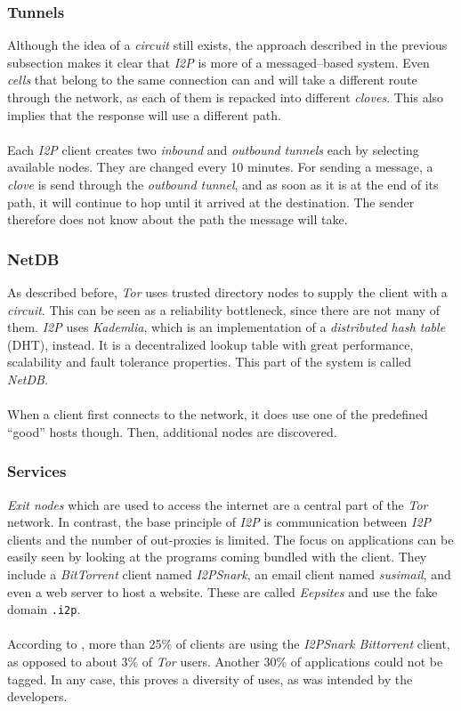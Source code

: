 \documentclass{sig-alternate}
\begin{document}
\subsubsection{Tunnels}
Although the idea of a \emph{circuit} still exists, the approach described in the previous subsection makes it clear that \emph{I2P} is more of a messaged--based system.
Even \emph{cells} that belong to the same connection can and will take a different route through the network, as each of them is repacked into different \emph{cloves}.
This also implies that the response will use a different path.
\\
\\
Each \emph{I2P} client creates two \emph{inbound} and \emph{outbound} \emph{tunnels} each by selecting available nodes.
They are changed every 10 minutes.
For sending a message, a \emph{clove} is send through the \emph{outbound tunnel}, and as soon as it is at the end of its path, it will continue to hop until it arrived at the destination.
The sender therefore does not know about the path the message will take\cite{olivier2011}.
\subsubsection{NetDB}
As described before, \emph{Tor} uses trusted directory nodes to supply the client with a \emph{circuit}.
This can be seen as a reliability bottleneck, since there are not many of them.
\emph{I2P} uses \emph{Kademlia}, which is an implementation of a \emph{distributed hash table} (DHT), instead.
It is a decentralized lookup table with great performance, scalability and fault tolerance properties.
This part of the system is called \emph{NetDB}.
\\
\\
When a client first connects to the network, it does use one of the predefined ``good'' hosts though.
Then, additional nodes are discovered.

\subsubsection{Services}
\emph{Exit nodes} which are used to access the internet are a central part of the \emph{Tor} network.
In contrast, the base principle of \emph{I2P} is communication between \emph{I2P} clients and the number of out-proxies is limited\cite{olivier2011}.
The focus on applications can be easily seen by looking at the programs coming bundled with the client.
They include a \emph{BitTorrent} client named \emph{I2PSnark}, an email client named \emph{susimail}, and even a web server to host a website\cite{i2p}.
These are called \emph{Eepsites} and use the fake domain \texttt{.i2p}.
\\
\\
According to \cite{olivier2011}, more than 25\% of clients are using the \emph{I2PSnark Bittorrent} client, as opposed to about 3\% of \emph{Tor} users.
Another 30\% of applications could not be tagged.
In any case, this proves a diversity of uses, as was intended by the developers.
\end{document}
